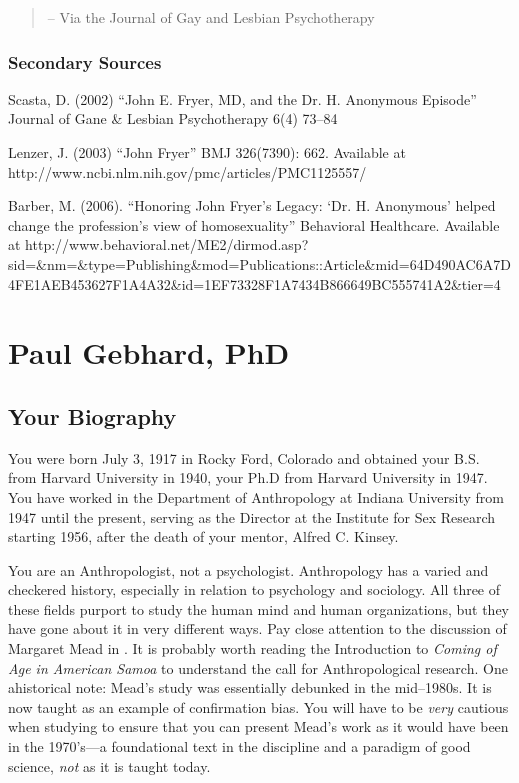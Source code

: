 \begin{refsection}
\begin{quote}
– Via the Journal of Gay and Lesbian Psychotherapy
\end{quote}

\subsection{Secondary Sources}
\label{secondarysources}

Scasta, D. (2002) “John E. Fryer, MD, and the Dr. H. Anonymous Episode” Journal of Gane \& Lesbian Psychotherapy 6(4) 73--84

Lenzer, J. (2003) “John Fryer” BMJ 326(7390): 662. Available at http:\slash \slash www.ncbi.nlm.nih.gov\slash pmc\slash articles\slash PMC1125557\slash 

Barber, M. (2006). “Honoring John Fryer's Legacy: `Dr. H. Anonymous' helped change the profession's view of homosexuality” Behavioral Healthcare. Available at http:\slash \slash www.behavioral.net\slash ME2\slash dirmod.asp?sid=\&nm=\&type=Publishing\&mod=Publications::Article\&mid=64D490AC6A7D4FE1AEB453627F1A4A32\&id=1EF73328F1A7434B866649BC555741A2\&tier=4

\chapter{Paul Gebhard, PhD}
\label{paulgebhardphd}

\section{Your Biography}
\label{yourbiography}

You were born July 3, 1917 in Rocky Ford, Colorado and obtained your B.S. from Harvard University in 1940, your Ph.D from Harvard University in 1947. You have worked in the Department of Anthropology at Indiana University from 1947 until the present, serving as the Director at the Institute for Sex Research starting 1956, after the death of your mentor, Alfred C. Kinsey.

You are an Anthropologist, not a psychologist. Anthropology has a varied and checkered history, especially in relation to psychology and sociology. All three of these fields purport to study the human mind and human organizations, but they have gone about it in very different ways. Pay close attention to the discussion of Margaret Mead in . It is probably worth reading the Introduction to \emph{Coming of Age in American Samoa} to understand the call for Anthropological research. One ahistorical note: Mead’s study was essentially debunked in the mid--1980s. It is now taught as an example of confirmation bias. You will have to be \emph{very} cautious when studying to ensure that you can present Mead’s work as it would have been in the 1970’s---a foundational text in the discipline and a paradigm of good science, \emph{not} as it is taught today. 


\end{refsection}
